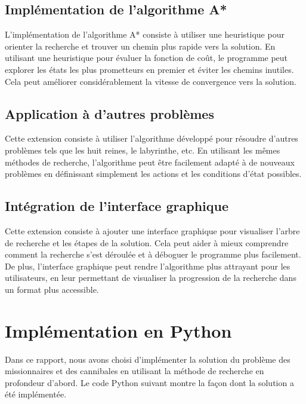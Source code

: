 \documentclass{article}
\begin{document}
\subsection{Implémentation de l'algorithme A*}
L'implémentation de l'algorithme A* consiste à utiliser une heuristique pour orienter la recherche et trouver un chemin plus rapide vers la solution. En utilisant une heuristique pour évaluer la fonction de coût, le programme peut explorer les états les plus prometteurs en premier et éviter les chemins inutiles. Cela peut améliorer considérablement la vitesse de convergence vers la solution.

\subsection{Application à d'autres problèmes}
Cette extension consiste à utiliser l'algorithme développé pour résoudre d'autres problèmes tels que les huit reines, le labyrinthe, etc. En utilisant les mêmes méthodes de recherche, l'algorithme peut être facilement adapté à de nouveaux problèmes en définissant simplement les actions et les conditions d'état possibles.

\subsection{Intégration de l'interface graphique}
Cette extension consiste à ajouter une interface graphique pour visualiser l'arbre de recherche et les étapes de la solution. Cela peut aider à mieux comprendre comment la recherche s'est déroulée et à déboguer le programme plus facilement. De plus, l'interface graphique peut rendre l'algorithme plus attrayant pour les utilisateurs, en leur permettant de visualiser la progression de la recherche dans un format plus accessible.


\section{Implémentation en Python}

Dans ce rapport, nous avons choisi d'implémenter la solution du problème des missionnaires et des cannibales en utilisant la méthode de recherche en profondeur d'abord. Le code Python suivant montre la façon dont la solution a été implémentée.
\end{document}
